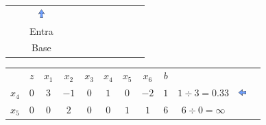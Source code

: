 \begin{frame}
{\begin{table}
\begin{tabular}{c c c c c c c c c c c c}
				& 
				&  \includegraphics[width=0.3cm,height=0.3cm]{setacima.jpg}
				& 
				& 
				& 
				& 
				&  
				&  
				& & & \\
				
				& 
				&  \scriptsize Entra 
				& 
				& 
				& 
				& 
				&  
				&  
				& & & \\
				
				& 
				&  \scriptsize Base
				& 
				& 
				& 
				& 
				&  
				&  
				& & & \\				
			\end{tabular}
		\end{table}
	}	
	{
		\begin{table}
			\begin{tabular}{c c c c c c c c c c c c}
				& \cellcolor{blue!80} \color{white} $ \scriptstyle z$
				& \cellcolor{blue!80} \color{white} $ \scriptstyle x_1$ 
				& \cellcolor{blue!80} \color{white} $ \scriptstyle x_2$
				& \cellcolor{blue!80} \color{red} $ \scriptstyle x_3$
				& \cellcolor{blue!80} \color{red} $ \scriptstyle x_4$
				& \cellcolor{blue!80} \color{red} $ \scriptstyle x_5$
				& \cellcolor{blue!80} \color{white} $ \scriptstyle x_6$ 
				& \cellcolor{blue!80} \color{white} $ \scriptstyle b$ \\
				\cellcolor{blue!80} \color{red} $ \scriptstyle x_4$
				& \cellcolor{yellow!60}  $ \scriptstyle 0$
				& \cellcolor{gray!60}  $ \scriptstyle 3$ 
				& \cellcolor{yellow!60}  $ \scriptstyle -1$
				& \cellcolor{yellow!60}  $ \scriptstyle 0$
				& \cellcolor{yellow!60}  $ \scriptstyle 1$
				& \cellcolor{yellow!60}  $ \scriptstyle 0$
				& \cellcolor{yellow!60}  $ \scriptstyle -2$ 
				& \cellcolor{gray!60}  $ \scriptstyle 1$ 
				& $ \scriptstyle 1 \div 3 = 0.33 $
				& \includegraphics[width=0.3cm,height=0.3cm]{setaesquerda.jpg} \\ 
				\cellcolor{blue!80} \color{red} $ \scriptstyle x_5$  
				& \cellcolor{yellow!60}  $ \scriptstyle 0$
				& \cellcolor{gray!60}  $ \scriptstyle 0$ 
				& \cellcolor{yellow!60}  $ \scriptstyle 2$
				& \cellcolor{yellow!60}  $ \scriptstyle 0$
				& \cellcolor{yellow!60}  $ \scriptstyle 0$
				& \cellcolor{yellow!60}  $ \scriptstyle 1$
				& \cellcolor{yellow!60}  $ \scriptstyle 1$ 
				& \cellcolor{gray!60}  $ \scriptstyle 6$ 
				& $ \scriptstyle 6 \div 0 = \infty $\\

\end{tabular}
\end{table}}
\end{frame}
